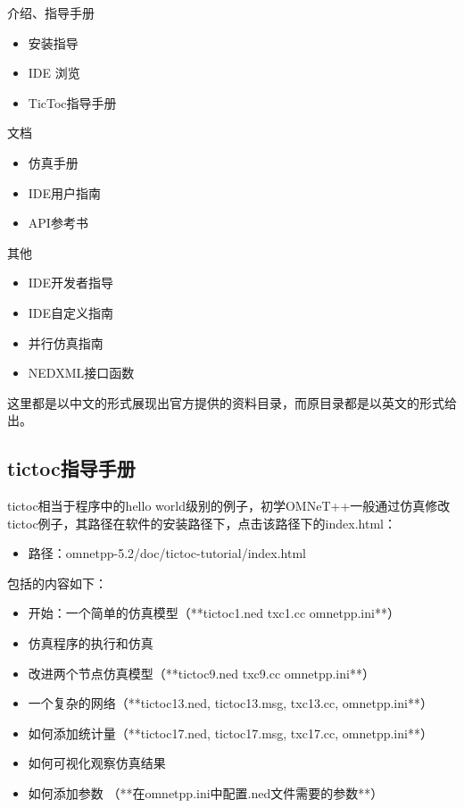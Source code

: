 介绍、指导手册
\begin{itemize}
\item 安装指导
\item IDE 浏览
\item TicToc指导手册
\end{itemize}

文档
\begin{itemize}
	\item 仿真手册
	\item IDE用户指南
	\item API参考书
\end{itemize}

其他
\begin{itemize}
	\item IDE开发者指导
	\item IDE自定义指南
	\item 并行仿真指南
	\item NEDXML接口函数 
\end{itemize}

这里都是以中文的形式展现出官方提供的资料目录，而原目录都是以英文的形式给出。\\

\subsection{tictoc指导手册}
tictoc相当于程序中的hello world级别的例子，初学OMNeT++一般通过仿真修改tictoc例子，其路径在软件的安装路径下，点击该路径下的index.html：

\begin{itemize}
	\item 路径：omnetpp-5.2/doc/tictoc-tutorial/index.html 
\end{itemize}

包括的内容如下：
\begin{itemize}
	\item 开始：一个简单的仿真模型（**tictoc1.ned txc1.cc omnetpp.ini**）
	\item 仿真程序的执行和仿真
	\item 改进两个节点仿真模型（**tictoc9.ned txc9.cc omnetpp.ini**）
	\item 一个复杂的网络（**tictoc13.ned, tictoc13.msg, txc13.cc, omnetpp.ini**）
	\item 如何添加统计量（**tictoc17.ned, tictoc17.msg, txc17.cc, omnetpp.ini**）
	\item 如何可视化观察仿真结果
	\item 如何添加参数 （**在omnetpp.ini中配置.ned文件需要的参数**）\\
\end{itemize}


